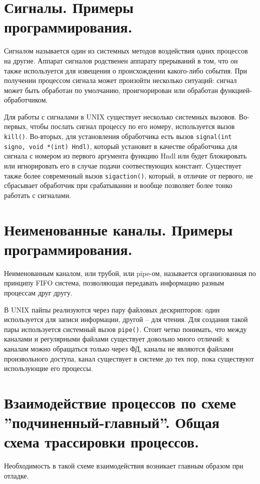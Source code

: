 \documentclass[a4paper,12pt,titlepage,finall]{article}
\begin{document}
\section{Сигналы. Примеры программирования.}
Сигналом называется один из системных методов воздействия одних процессов на другие. Аппарат сигналов родственен аппарату прерываний в том, что он также используется для извещения о происхождении какого-либо события. При получении процессом сигнала может произойти несколько ситуаций: сигнал может быть обработан по умолчанию, проигнорирован или обработан функцией-обработчиком.

Для работы с сигналами в UNIX существует несколько системных вызовов. Во-первых, чтобы послать сигнал процессу по его номеру, используется вызов \texttt{kill()}. Во-вторых, для установления обработчика есть вызов \texttt{signal(int signo, void *(int) Hndl)}, который установит в качестве обработчика для сигнала с номером из первого аргумента функцию Hndl или будет блокировать или игнорировать его в случае подачи соотвествующих констант. Существует также более современный вызов \texttt{sigaction()}, который, в отличие от первого, не сбрасывает обработчик при срабатывании и вообще позволяет более тонко работать с сигналами.

\section{Неименованные каналы. Примеры
программирования.}
Неименованным каналом, или трубой, или pipe-ом, называется организованная по принципу FIFO система, позволяющая передавать информацию разным процессам друг другу.

В UNIX пайпы реализуются через пару файловых дескрипторов: один используется для записи информации, другой -- для чтения. Для создания такой пары используется системный вызов \texttt{pipe()}. Стоит четко понимать, что между каналами и регулярными файлами существует довольно много отличий: к каналам можно обращаться только через ФД, каналы не являются файлами произвольного доступа, канал существует в системе до тех пор, пока существуют использующие его процессы.

\section{Взаимодействие процессов по схеме
”подчиненный-главный”. Общая схема трассировки процессов.}
Необходимость в такой схеме взаимодействия возникает главным образом при отладке.
\end{document}
